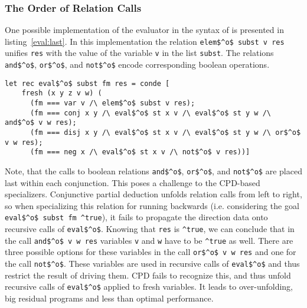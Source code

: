 \subsubsection{The Order of Relation Calls}

One possible implementation of the evaluator in the syntax of \oc{} is presented in listing~\ref{eval:last}.
In this implementation the relation \lstinline{elem$^o$ subst v res} unifies \lstinline{res} with the value of the variable \lstinline{v} in the list \lstinline{subst}.
The relations \lstinline{and$^o$}, \lstinline{or$^o$}, and \lstinline{not$^o$} encode corresponding boolean operations.

\begin{figure*}[!h]
  \centering
  \begin{minipage}{0.8\textwidth}
    \begin{lstlisting}[label={eval:last}, caption={Evaluator of formulas with boolean operation last}, captionpos=b, frame=tb]
  let rec eval$^o$ subst fm res = conde [
    fresh (x y z v w) (
      (fm === var v /\ elem$^o$ subst v res);
      (fm === conj x y /\ eval$^o$ st x v /\ eval$^o$ st y w /\ and$^o$ v w res);
      (fm === disj x y /\ eval$^o$ st x v /\ eval$^o$ st y w /\ or$^o$ v w res);
      (fm === neg x /\ eval$^o$ st x v /\ not$^o$ v res))]
    \end{lstlisting}
  \end{minipage}
\end{figure*}

Note, that the calls to boolean relations \lstinline{and$^o$}, \lstinline{or$^o$}, and \lstinline{not$^o$} are placed last within each conjunction.
This poses a challenge to the CPD-based specializers.
Conjunctive partial deduction unfolds relation calls from left to right, so when specializing this relation for running backwards (i.e. considering the goal \lstinline{eval$^o$ subst fm ^true}), it fails to propagate the direction data onto recursive calls of \lstinline{eval$^o$}.
Knowing that \lstinline{res} is \lstinline{^true}, we can conclude that in the call \lstinline{and$^o$ v w res} variables \lstinline{v} and \lstinline{w} have to be \lstinline{^true} as well.
There are three possible options for these variables in the call \lstinline{or$^o$ v w res} and one for the call \lstinline{not$^o$}.
These variables are used in recursive calls of \lstinline{eval$^o$} and thus restrict the result of driving them.
CPD fails to recognize this, and thus unfold recursive calls of \lstinline{eval$^o$} applied to fresh variables.
It leads to over-unfolding, big residual programs and less than optimal performance.

